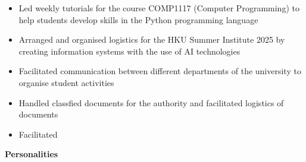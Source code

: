 \documentclass[10pt,a4paper,withhypeper,normalphoto]{altacv}
\begin{document}
\begin{paracol}{2}


\begin{itemize}
  \item Led weekly tutorials for the course COMP1117 (Computer Programming) to help students develop skills in the Python programming language
\end{itemize}

\begin{itemize}
\item Arranged and organised logistics for the HKU Summer Institute 2025 by creating information systems with the use of AI technologies
\item Facilitated communication between different departments of the university to organise student activities
\end{itemize}

\divider


\begin{itemize}
\item Handled classfied documents for the authority and facilitated logistics of documents
\item Facilitated 
\end{itemize}


\switchcolumn



\textbf{\color{accent}Personalities}


\end{paracol}
\end{document}
